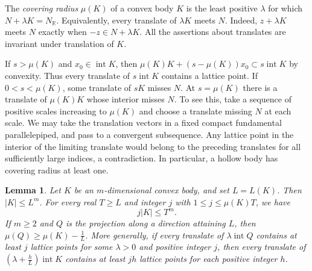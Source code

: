 \documentclass[reqno, 11pt]{article}
\numberwithin{equation}{section}
\newtheorem{lemma}[lemma]{Lemma}
\theoremstyle{definition}
\newcommand{\R}{\mathbb R}
\DeclareMathOperator{\intr}{int}
\begin{document}
The \emph{covering radius} $\mu(K)$ of a convex body $K$ is the least
positive $\lambda$ for which $N+\lambda K=N_\R$. Equivalently, every
translate of $\lambda K$ meets $N$. Indeed, $z+\lambda K$ meets $N$
exactly when $-z\in N+\lambda K$. All the assertions about translates
are invariant under translation of $K$.

If $s>\mu(K)$ and $x_0\in\intr K$, then
$\mu(K)K+(s-\mu(K))x_0\subset s\intr K$ by convexity. Thus every
translate of $s\intr K$ contains a lattice point. If $0<s<\mu(K)$,
some translate of $sK$ misses $N$. At $s=\mu(K)$ there is a translate
of $\mu(K)K$ whose interior misses $N$. To see this, take a sequence
of positive scales increasing to $\mu(K)$ and choose a translate
missing $N$ at each scale. We may take the translation vectors in
a fixed compact fundamental parallelepiped, and pass to a convergent
subsequence. Any lattice point in the interior of the limiting
translate would belong to the preceding translates for all sufficiently
large indices, a contradiction. In particular, a hollow body has
covering radius at least one.

\begin{lemma}\label{aux:torus}
Let $K$ be an $m$-dimensional convex body, and set $L=L(K)$.
Then $|K|\le L^m$. For every real $T\ge L$ and integer $j$ with
$1\le j\le\mu(K)T$, we have
\[
                              j|K|\le T^m.
\]
If $m\ge2$ and $Q$ is the projection along a direction attaining $L$,
then $\mu(Q)\ge\mu(K)-\frac{1}{L}$. More generally, if every translate of
$\lambda\intr Q$ contains at least $j$ lattice points for some
$\lambda>0$ and positive integer $j$, then every translate of
$(\lambda+\frac{h}{L})\intr K$ contains at least $jh$ lattice points for
each positive integer $h$.
\end{lemma}
\end{document}
